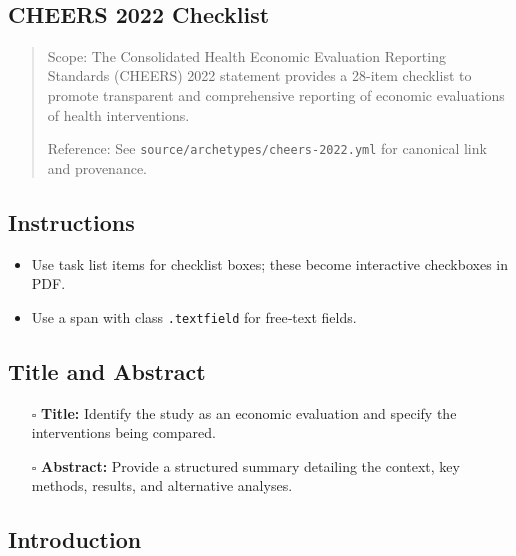 \documentclass[11pt]{article}
\def\tightlist{}
\begin{document}
\begin{center}
{\LARGE }\\[4pt]
\normalsize 
\end{center}
\vspace{1em}

\begin{Form}

\section{CHEERS 2022 Checklist}\label{cheers-2022-checklist}

\begin{quote}
Scope: The Consolidated Health Economic Evaluation Reporting Standards
(CHEERS) 2022 statement provides a 28-item checklist to promote
transparent and comprehensive reporting of economic evaluations of
health interventions.

Reference: See \texttt{source/archetypes/cheers-2022.yml} for canonical
link and provenance.
\end{quote}

\subsection{Instructions}\label{instructions}

\begin{itemize}
\tightlist
\item
  Use task list items for checklist boxes; these become interactive
  checkboxes in PDF.
\item
  Use a span with class \texttt{.textfield} for free‑text fields.
\end{itemize}

\subsection{Title and Abstract}\label{title-and-abstract}

\begin{itemize}
\tightlist
\item[$\square$]
  \textbf{Title:} Identify the study as an economic evaluation and
  specify the interventions being compared.
\item[$\square$]
  \textbf{Abstract:} Provide a structured summary detailing the context,
  key methods, results, and alternative analyses.
\end{itemize}

\subsection{Introduction}\label{introduction}


\end{Form}
\end{document}
